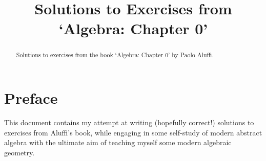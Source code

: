 \documentclass[]{amsbook}
\theoremstyle{plain}
\numberwithin{equation}{section}
\theoremstyle{definition}
\newcommand{\0}{\mathbf{0}}
\newcommand{\1}{\mathbf{1}}
\begin{document}
\frontmatter
\title[`Algebra: Chapter 0']{Solutions to Exercises from `Algebra: Chapter 0'}

\begin{abstract}
Solutions to exercises from the book `Algebra: Chapter 0' by Paolo Aluffi.
\end{abstract}

\maketitle
\tableofcontents

\chapter*{Preface}

 This document contains my attempt at writing
(hopefully correct!) solutions to exercises from Aluffi's book, while engaging
in some self-study of modern abstract algebra with the ultimate aim of teaching
myself some modern algebraic geometry.
\mainmatter


\end{document}
